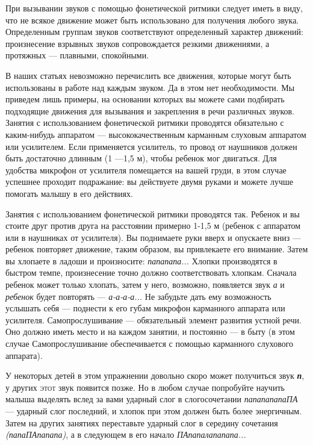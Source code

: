 \documentclass{book}
\renewcommand{\emph}[1]{\textit{#1}}
\begin{document}
При вызывании звуков с помощью фонетической ритмики следует иметь в
виду, что не всякое движение может быть использовано для получения
любого звука. Определенным группам звуков соответствуют определенный
характер движений: произнесение взрывных звуков сопровождается резкими
движениями, а протяжных --- плавными, спокойными.

В наших статьях невозможно перечислить все движения, которые могут быть
использованы в работе над каждым звуком. Да в этом нет необходимости. Мы
приведем лишь примеры, на основании которых вы можете сами подбирать
подходящие движения для вызывания и закрепления в речи различных звуков.
Занятия с использованием фонетической ритмики проводятся обязательно с
каким-нибудь аппаратом --- высококачественным карманным слуховым
аппаратом или усилителем. Если применяется усилитель, то провод от
наушников должен быть достаточно длинным (1 ---1,5 м), чтобы ребенок мог
двигаться. Для удобства микрофон от усилителя помещается на вашей груди,
в этом случае успешнее проходит подражание: вы действуете двумя руками и
можете лучше помогать малышу в его действиях.

Занятия с использованием фонетической ритмики проводятся так. Ребенок и
вы стоите друг против друга на расстоянии примерно 1-1,5 м (ребенок с
аппаратом или в наушниках от усилителя). Вы поднимаете руки вверх и
опускаете вниз --- ребенок повторяет движение, таким образом, вы
привлекаете его внимание. Затем вы хлопаете в ладоши и произносите:
\emph{папапапа...} Хлопки производятся в быстром темпе, произнесение
точно должно соответствовать хлопкам. Сначала ребенок может только
хлопать, затем у него, возможно, появляется звук \emph{а} и
\emph{ребенок} будет повторять --- \emph{а-а-а-а...} Не забудьте дать
ему возможность услышать себя --- поднести к его губам микрофон
карманного аппарата или усилителя. Самопрослушивание --- обязательный
элемент развития устной речи. Оно должно иметь место и на каждом
занятии, и постоянно --- в быту (в этом случае Самопрослушивание
обеспечивается с помощью карманного слухового аппарата).

У некоторых детей в этом упражнении довольно скоро может получиться звук
\emph{\textbf{п}}, у других \textsc{этот} звук появится позже. Но в
любом случае попробуйте научить малыша выделять вслед за вами ударный
слог в слогосочетании \emph{папапапапаПА} --- ударный слог последний, и
хлопок при этом должен быть более энергичным. Затем на других занятиях
переставьте ударный слог в середину сочетания \emph{(папаПАпапапа)}, а в
следующем в его начало \emph{ПАпапалапапапа...}
\end{document}
